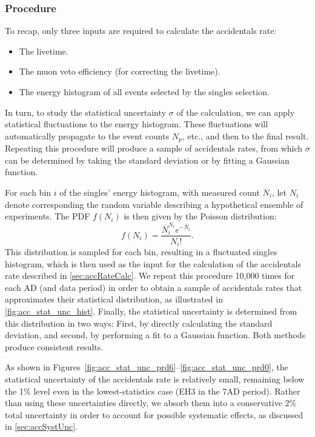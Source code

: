 \documentclass[../thesis.tex]{subfiles}
\begin{document}
\subsubsection{Procedure}
\label{sec:accStatUncProc}

To recap, only three inputs are required to calculate the accidentals rate:
\begin{itemize}
\item The livetime.
\item The muon veto efficiency (for correcting the livetime).
\item The energy histogram of all events selected by the singles selection.
\end{itemize}
In turn, to study the statistical uncertainty $\sigma$ of the calculation, we can apply statistical fluctuations to the energy histogram. These fluctuations will automatically propagate to the event counts $N_p$, etc., and then to the final result. Repeating this procedure will produce a sample of accidentals rates, from which $\sigma$ can be determined by taking the standard deviation or by fitting a Gaussian function.

For each bin $i$ of the singles' energy histogram, with measured count $\overline{N}_i$, let $N_i$ denote corresponding the random variable describing a hypothetical ensemble of experiments. The PDF $f(N_i)$ is then given by the Poisson distribution:
\begin{equation}
  f(N_i) = \frac{\overline{N}_i^{N_i}e^{-\overline{N}_i}}{N_i!}.
\end{equation}
This distribution is sampled for each bin, resulting in a fluctuated singles histogram, which is then used as the input for the calculation of the accidentals rate described in \autoref{sec:accRateCalc}. We repeat this procedure 10,000 times for each AD (and data period) in order to obtain a sample of accidentals rates that approximates their statistical distribution, as illustrated in \autoref{fig:acc_stat_unc_hist}. Finally, the statistical uncertainty is determined from this distribution in two ways: First, by directly calculating the standard deviation, and second, by performing a fit to a Gaussian function. Both methods produce consistent results.

As shown in Figures~\ref{fig:acc_stat_unc_prd6}--\ref{fig:acc_stat_unc_prd0}, the statistical uncertainty of the accidentals rate is relatively small, remaining below the 1\% level even in the lowest-statistics case (EH3 in the 7AD period). Rather than using these uncertainties directly, we absorb them into a conservative 2\% total uncertainty in order to account for possible systematic effects, as discussed in \autoref{sec:accSystUnc}.
\end{document}
